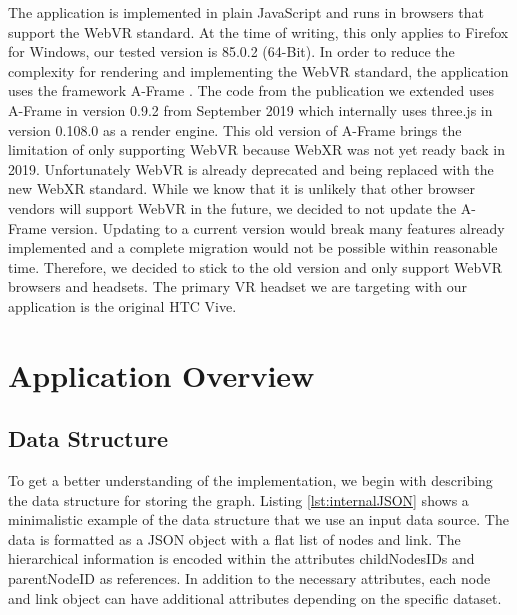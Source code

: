 The application is implemented in plain JavaScript and runs in browsers that support the WebVR standard. 
At the time of writing, this only applies to Firefox for Windows, our tested version is 85.0.2 (64-Bit). 
In order to reduce the complexity for rendering and implementing the WebVR standard, the application uses the framework A-Frame \cite{aframe}. The code from the publication we extended uses A-Frame in version 0.9.2 from September 2019 which internally uses three.js \cite{threejs} in version 0.108.0 as a render engine.
This old version of A-Frame brings the limitation of only supporting WebVR because WebXR was not yet ready back in 2019.
Unfortunately WebVR is already deprecated and being replaced with the new WebXR standard.
While we know that it is unlikely that other browser vendors will support WebVR in the future, we decided to not update the A-Frame version. Updating to a current version would break many features already implemented and a complete migration would not be possible within reasonable time. Therefore, we decided to stick to the old version and only support WebVR browsers and headsets.
The primary VR headset we are targeting with our application is the original HTC Vive.

\section{Application Overview}




\label{sec:applOverview}
\subsection{Data Structure}
\label{subSec:dataStruct}
To get a better understanding of the implementation, we begin with describing the data structure for storing the graph.
Listing \ref{lst:internalJSON} shows a minimalistic example of the data structure that we use an input data source. The data is formatted as a JSON object with a flat list of nodes and link. The hierarchical information is encoded within the attributes childNodesIDs and parentNodeID as references. 
In addition to the necessary attributes, each node and link object can have additional attributes depending on the specific dataset.

